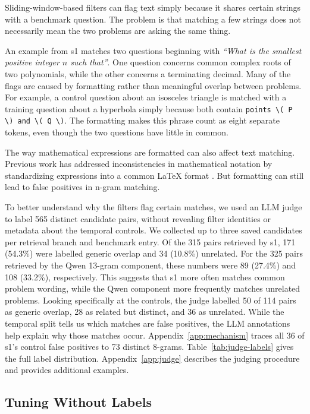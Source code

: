 \documentclass[11pt]{article}
\begin{document}
Sliding-window-based filters can flag text simply because it shares certain strings with a benchmark question. The problem is that matching a few strings does not necessarily mean the two problems are asking the same thing.

An example from s1 matches two questions beginning with \textit{``What is the smallest positive integer $n$ such that''}. One question concerns common complex roots of two polynomials, while the other concerns a terminating decimal. Many of the flags are caused by formatting rather than meaningful overlap between problems. For example, a control question about an isosceles triangle is matched with a training question about a hyperbola simply because both contain \texttt{points \textbackslash( P \textbackslash) and \textbackslash( Q \textbackslash)}. The formatting makes this phrase count as eight separate tokens, even though the two questions have little in common.

The way mathematical expressions are formatted can also affect text matching. Previous work has addressed inconsistencies in mathematical notation by standardizing expressions into a common LaTeX format \citep{ICLR2026_84f421a2}. But formatting can still lead to false positives in n-gram matching.

To better understand why the filters flag certain matches, we used an LLM judge to label 565 distinct candidate pairs, without revealing filter identities or metadata about the temporal controls. We collected up to three saved candidates per retrieval branch and benchmark entry. Of the 315 pairs retrieved by s1, 171 (54.3\%) were labelled generic overlap and 34 (10.8\%) unrelated. For the 325 pairs retrieved by the Qwen 13-gram component, these numbers were 89 (27.4\%) and 108 (33.2\%), respectively. This suggests that s1 more often matches common problem wording, while the Qwen component more frequently matches unrelated problems. Looking specifically at the controls, the judge labelled 50 of 114 pairs as generic overlap, 28 as related but distinct, and 36 as unrelated. While the temporal split tells us which matches are false positives, the LLM annotations help explain why those matches occur. Appendix~\ref{app:mechanism} traces all 36 of s1's control false positives to 73 distinct 8-grams. Table~\ref{tab:judge-labels} gives the full label distribution. Appendix~\ref{app:judge} describes the judging procedure and provides additional examples.

\subsection{Tuning Without Labels}
\label{sec:calibration}
\end{document}
